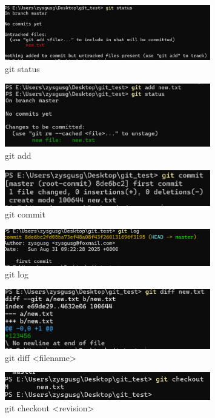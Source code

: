 \documentclass[UTF8]{ctexart}
\begin{document}
\begin{figure}[htbp]
    \centering
    \includegraphics[width=0.8\textwidth]{3.png} 
    \caption{git status}
\end{figure}
\begin{figure}[htbp]
    \centering
    \includegraphics[width=0.8\textwidth]{4.png} 
    \caption{git add}
\end{figure}
\begin{figure}[htbp]
    \centering
    \includegraphics[width=0.8\textwidth]{5.png} 
    \caption{git commit}
\end{figure}
\begin{figure}[htbp]
    \centering
    \includegraphics[width=0.8\textwidth]{6.png} 
    \caption{git log}
\end{figure}
\begin{figure}[htbp]
    \centering
    \includegraphics[width=0.8\textwidth]{7.png} 
    \caption{git diff <filename>}
\end{figure}
\begin{figure}[htbp]
    \centering
    \includegraphics[width=0.8\textwidth]{8.png} 
    \caption{git checkout <revision>}
\end{figure}
\end{document}
